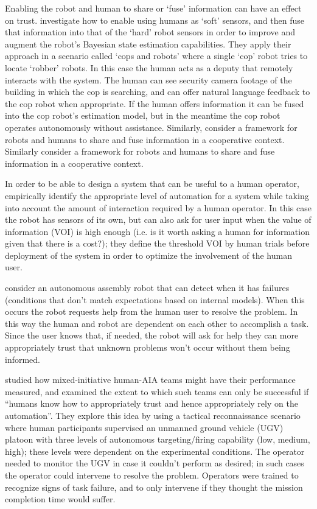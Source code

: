 Enabling the robot and human to share or `fuse' information can have an effect on trust. \citet{Sweet2016-dw} investigate how to enable using humans as `soft' sensors, and then fuse that information into that of the `hard' robot sensors in order to improve and augment the robot's Bayesian state estimation capabilities. They apply their approach in a scenario called `cops and robots' where a single `cop' robot tries to locate `robber' robots. In this case the human acts as a deputy that remotely interacts with the system. The human can see security camera footage of the building in which the cop is searching, and can offer natural language feedback to the cop robot when appropriate. If the human offers information it can be fused into the cop robot's estimation model, but in the meantime the cop robot operates autonomously without assistance. Similarly, \citet{Tse2015-tz} consider a framework for robots and humans to share and fuse information in a cooperative context.
Similarly \citet{Tse2015-tz} consider a framework for robots and humans to share and fuse information in a cooperative context. 

In order to be able to design a system that can be useful to a human operator, \citet{Kaupp2008-yr,Kaupp2005-pk} empirically identify the appropriate level of automation for a system while taking into account the amount of interaction required by a human operator. In this case the robot has sensors of its own, but can also ask for user input when the value of information (VOI) is high enough (i.e. is it worth asking a human for information given that there is a cost?); they define the threshold VOI by human trials before deployment of the system in order to optimize the involvement of the human user.

\citet{Tellex2014-uc} consider an autonomous assembly robot that can detect when it has failures (conditions that don't match expectations based on internal models). When this occurs the robot requests help from the human user to resolve the problem. In this way the human and robot are dependent on each other to accomplish a task. Since the user knows that, if needed, the robot will ask for help they can more appropriately trust that unknown problems won't occur without them being informed.

\citet{Freedy2007-sg} studied how mixed-initiative human-AIA teams might have their performance measured, and examined the extent to which such teams can only be successful if ``humans know how to appropriately trust and hence appropriately rely on the automation''. They explore this idea by using a tactical reconnaissance scenario where human participants supervised an unmanned ground vehicle (UGV)  platoon with three levels of autonomous targeting/firing capability (low, medium, high); these levels were dependent on the experimental conditions. The operator needed to monitor the UGV in case it couldn't perform as desired; in such cases the operator could intervene to resolve the problem. Operators were trained to recognize signs of task failure, and to only intervene if they thought the mission completion time would suffer.

